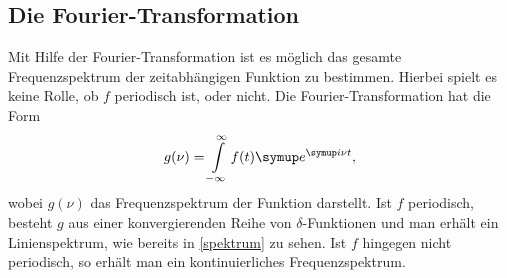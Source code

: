 \subsection{Die Fourier-Transformation}
Mit Hilfe der Fourier-Transformation ist es möglich das gesamte Frequenzspektrum
der zeitabhängigen Funktion zu bestimmen. Hierbei spielt es keine Rolle, ob
$f$ periodisch ist, oder nicht. Die Fourier-Transformation hat die Form
\begin{equation}
  g(\nu) = \int\limits_{-\infty}^{\infty}f(t)\su{e}^{\su{i}\nu t},
\end{equation}
wobei $g(\nu)$ das Frequenzspektrum der Funktion darstellt. Ist $f$ periodisch,
besteht $g$ aus einer konvergierenden Reihe von $\delta$-Funktionen und man
erhält ein Linienspektrum, wie bereits in \ref{spektrum} zu sehen. Ist $f$
hingegen nicht periodisch, so erhält man ein kontinuierliches Frequenzspektrum.
